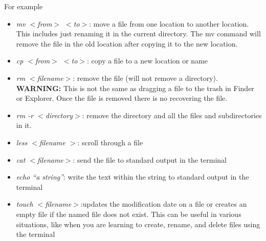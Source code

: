 \documentclass[12pt]{article}
\begin{document}
For example
\begin{itemize}
\item \textit{mv $<$from$>$ $<$to$>$}: move a file from one location to another location. This includes just renaming it in the current directory. The mv command will remove the file in the old location after copying it to the new location.
\item \textit{cp $<$from$>$ $<$to$>$}: copy a file to a new location or name
\item \textit{rm $<$filename$>$}: remove the file (will not remove a directory). \textbf{WARNING:} This is not the same as dragging a file to the trash in Finder or Explorer. Once the file is removed there is no recovering the file.
\item \textit{rm -r $<$directory$>$}: remove the directory and all the files and subdirectories in it.
\item \textit{less $<$filename $>$}: scroll through a file
\item \textit{cat $<$filename$>$}: send the file to standard output in the terminal
\item \textit{echo ``a string''}: write the text within the string to standard output in the terminal 
  \item \textit{touch $<$filename$>$}:updates the modification date on a file or creates an empty file if the named file does not exist. This can be useful in various situations, like when you are learning to create, rename, and delete files using the terminal
\end{itemize}
\end{document}
